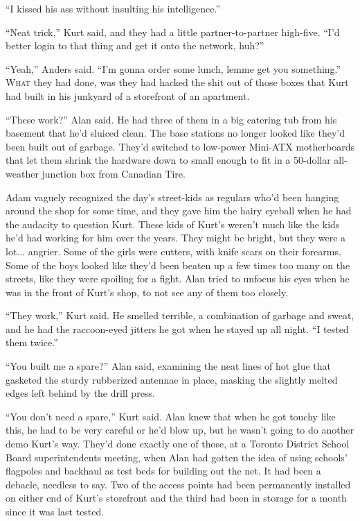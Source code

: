 ``I kissed his ass without insulting his intelligence.''

``Neat trick,'' Kurt said, and they had a little partner-to-partner
high-five.  ``I'd better login to that thing and get it onto the
network, huh?''

``Yeah,'' Anders said.  ``I'm gonna order some lunch, lemme get you
something.''
\\
\lettrine[lines=3, lhang=.5, nindent=0pt, findent=2pt]{W}{hat} they had done, was they had hacked the shit out of those boxes
that Kurt had built in his junkyard of a storefront of an apartment.

``These work?'' Alan said.  He had three of them in a big catering tub
from his basement that he'd sluiced clean.  The base stations no
longer looked like they'd been built out of garbage.  They'd switched
to low-power Mini-ATX motherboards that let them shrink the hardware
down to small enough to fit in a 50-dollar all-weather junction box
from Canadian Tire.

Adam vaguely recognized the day's street-kids as regulars who'd been
hanging around the shop for some time, and they gave him the hairy
eyeball when he had the audacity to question Kurt.  These kids of
Kurt's weren't much like the kids he'd had working for him over the
years.  They might be bright, but they were a lot...  angrier.  Some
of the girls were cutters, with knife scars on their forearms.  Some
of the boys looked like they'd been beaten up a few times too many on
the streets, like they were spoiling for a fight.  Alan tried to
unfocus his eyes when he was in the front of Kurt's shop, to not see
any of them too closely.

``They work,'' Kurt said.  He smelled terrible, a combination of
garbage and sweat, and he had the raccoon-eyed jitters he got when he
stayed up all night.  ``I tested them twice.''

``You built me a spare?'' Alan said, examining the neat lines of hot
glue that gasketed the sturdy rubberized antennae in place, masking
the slightly melted edges left behind by the drill press.

``You don't need a spare,'' Kurt said.  Alan knew that when he got
touchy like this, he had to be very careful or he'd blow up, but he
wasn't going to do another demo Kurt's way.  They'd done exactly one
of those, at a Toronto District School Board superintendents meeting,
when Alan had gotten the idea of using schools' flagpoles and backhaul
as test beds for building out the net.  It had been a debacle,
needless to say.  Two of the access points had been permanently
installed on either end of Kurt's storefront and the third had been in
storage for a month since it was last tested.

